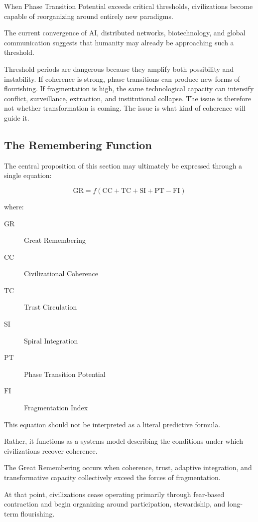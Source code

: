\documentclass[12pt]{article}
\begin{document}
When Phase Transition Potential exceeds critical thresholds, civilizations become capable of reorganizing around entirely new paradigms.

The current convergence of AI, distributed networks, biotechnology, and global communication suggests that humanity may already be approaching such a threshold.

Threshold periods are dangerous because they amplify both possibility and instability. If coherence is strong, phase transitions can produce new forms of flourishing. If fragmentation is high, the same technological capacity can intensify conflict, surveillance, extraction, and institutional collapse. The issue is therefore not whether transformation is coming. The issue is what kind of coherence will guide it.

\subsection{The Remembering Function}

The central proposition of this section may ultimately be expressed through a single equation:

\[
\mathrm{GR}=f(\mathrm{CC}+\mathrm{TC}+\mathrm{SI}+\mathrm{PT}-\mathrm{FI})
\]

where:

\begin{description}
  \item[\(\mathrm{GR}\)] Great Remembering
  \item[\(\mathrm{CC}\)] Civilizational Coherence
  \item[\(\mathrm{TC}\)] Trust Circulation
  \item[\(\mathrm{SI}\)] Spiral Integration
  \item[\(\mathrm{PT}\)] Phase Transition Potential
  \item[\(\mathrm{FI}\)] Fragmentation Index
\end{description}

This equation should not be interpreted as a literal predictive formula.

Rather, it functions as a systems model describing the conditions under which civilizations recover coherence.

The Great Remembering occurs when coherence, trust, adaptive integration, and transformative capacity collectively exceed the forces of fragmentation.

At that point, civilizations cease operating primarily through fear-based contraction and begin organizing around participation, stewardship, and long-term flourishing.
\end{document}
